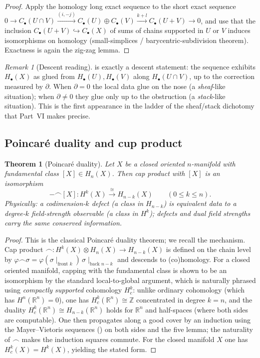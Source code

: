 \documentclass[12pt]{article}
\newtheorem{theorem}{Theorem}[section]
\theoremstyle{definition}
\theoremstyle{remark}
\newtheorem{remark}[remark]{Remark}
\newcommand{\Zm}{\mathbb{Z}}
\newcommand{\Rm}{\mathbb{R}}
\begin{document}
\begin{proof}
Apply the homology long exact sequence to the short exact sequence
$0\to C_\bullet(U\cap V)\xrightarrow{(i,-j)}C_\bullet(U)\oplus C_\bullet(V)
\xrightarrow{k+l}C_\bullet(U+V)\to 0$, and use that the inclusion
$C_\bullet(U+V)\hookrightarrow C_\bullet(X)$ of sums of chains supported in $U$ or
$V$ induces isomorphisms on homology (small-simplices / barycentric-subdivision
theorem). Exactness is again the zig-zag lemma.
\end{proof}

\begin{remark}[Descent reading]
\label{rem:mv-descent}
 is exactly a descent statement: the sequence exhibits $H_\bullet(X)$
as glued from $H_\bullet(U),H_\bullet(V)$ along $H_\bullet(U\cap V)$, up to the
correction measured by $\partial$. When $\partial=0$ the local data glue on the
nose (a \emph{sheaf}-like situation); when $\partial\ne 0$ they glue only up to
the obstruction (a \emph{stack}-like situation). This is the first appearance in
the ladder of the sheaf/stack dichotomy that Part~VI makes precise.
\end{remark}

\subsection{Poincar\'e duality and cup product}

\begin{theorem}[Poincar\'e duality]
\label{thm:pd}
Let $X$ be a closed oriented $n$-manifold with fundamental class $[X]\in H_n(X)$.
Then cap product with $[X]$ is an isomorphism
\[
  -\frown[X]\colon H^k(X)\xrightarrow{\ \cong\ }H_{n-k}(X)\qquad(0\le k\le n).
\]
Physically: a codimension-$k$ defect (a class in $H_{n-k}$) is equivalent data to
a degree-$k$ field-strength observable (a class in $H^k$); defects and dual field
strengths carry the same conserved information.
\end{theorem}

\begin{proof}
This is the classical Poincar\'e duality theorem; we recall the mechanism. Cap
product $\frown\colon H^k(X)\otimes H_n(X)\to H_{n-k}(X)$ is defined on the chain
level by $\varphi\frown\sigma=\varphi(\sigma\!\mid_{\text{front }k})\,\sigma\!\mid_{\text{back }n-k}$
and descends to (co)homology. For a closed oriented manifold, capping with the
fundamental class is shown to be an isomorphism by the standard local-to-global
argument, which is naturally phrased using \emph{compactly supported} cohomology
$H^k_c$: unlike ordinary cohomology (which has $H^n(\Rm^n)=0$), one has
$H^k_c(\Rm^n)\cong\Zm$ concentrated in degree $k=n$, and the duality
$H^k_c(\Rm^n)\cong H_{n-k}(\Rm^n)$ holds for $\Rm^n$ and half-spaces (where both
sides are computable). One then propagates along a good cover by an induction
using the Mayer--Vietoris sequences () on both sides and the five
lemma; the naturality of $\frown$ makes the induction squares commute. For the
closed manifold $X$ one has $H^k_c(X)=H^k(X)$, yielding the stated form.
\end{proof}
\end{document}

